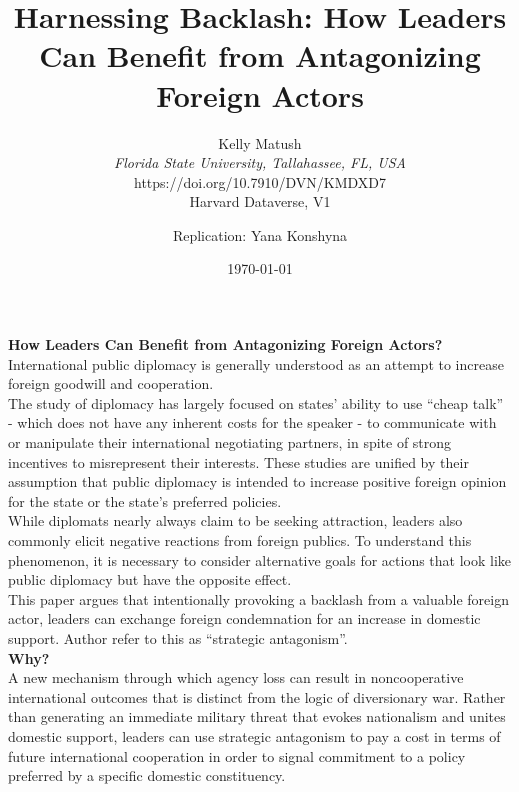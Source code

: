 \documentclass[12pt,letterpaper]{article}
\begin{document}
	
\title{\textbf{Harnessing Backlash: How Leaders Can Benefit from Antagonizing Foreign Actors}}
\author{Kelly Matush \\ \textit{Florida State University, Tallahassee, FL, USA} \\ https://doi.org/10.7910/DVN/KMDXD7 \\ Harvard Dataverse, V1 \\ \and Replication: Yana Konshyna}
\date{\today}
	
	\maketitle 
	
\textbf{How Leaders Can Benefit from Antagonizing Foreign Actors? }\\

International public diplomacy is generally understood as an attempt to increase foreign goodwill and cooperation. \\

The study of diplomacy has largely focused on states’ ability to use “cheap talk” - which does not have any inherent costs for the speaker - to communicate with or manipulate their international negotiating partners, in spite of strong incentives to misrepresent their interests. These studies are unified by their assumption that public diplomacy is intended to increase positive foreign opinion for the state or the state’s preferred policies.\\

While diplomats nearly always claim to be seeking attraction, leaders also commonly elicit negative reactions from foreign publics. To understand this phenomenon, it is necessary to consider alternative goals for actions that look like public diplomacy but have the opposite effect.\\

This paper argues that intentionally provoking a backlash from a valuable foreign actor, leaders can exchange foreign condemnation for an increase in domestic support. Author refer to this as “strategic antagonism”. \\


\textbf{Why?}\\

A new mechanism through which agency loss can result in noncooperative international outcomes that is distinct from the logic of diversionary war. Rather than generating an immediate military threat that evokes nationalism and unites domestic support, leaders can use strategic antagonism to pay a cost in terms of future international cooperation in order to signal commitment to a policy preferred by a specific domestic constituency.\\
\end{document}
